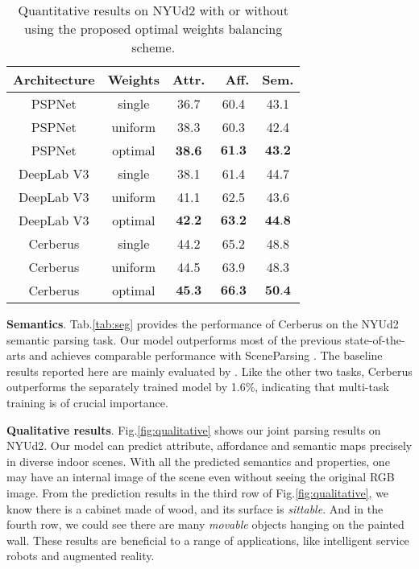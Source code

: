 \documentclass[10pt,twocolumn,letterpaper]{article}
\begin{document}
\begin{table}
	\centering
	\small 
	\begin{tabular}{c|c|ccc}
		\toprule
\textbf{Architecture} & \textbf{Weights} & \textbf{Attr.} & \ \textbf{Aff.} & \textbf{Sem.} \\
		\midrule
	    PSPNet  & single & 36.7 & 60.4 &  43.1\\
	    PSPNet & uniform & 38.3 & 60.3 & 42.4 \\
		PSPNet & optimal &\textbf{38.6} & {$\textbf{61.3}$}  & $\textbf{43.2}$ \\
		\midrule
		DeepLab V3  &single&  38.1 & 61.4 & 44.7 \\
		DeepLab V3 & uniform &  41.1 & 62.5 & 43.6\\
		DeepLab V3 & optimal &$\textbf{42.2}$ &$\textbf{63.2}$ & $\textbf{44.8}$  \\	
		\midrule
		Cerberus &single & {44.2} & 65.2 & 48.8\\
		Cerberus & uniform &  {44.5} & 63.9 & 48.3\\
		Cerberus & optimal & {$\textbf{45.3}$}  & {$\textbf{66.3}$} & {$\textbf{50.4}$} \\
		\bottomrule
	\end{tabular}
	\caption{Quantitative results on NYUd2 with or without using the proposed optimal weights balancing scheme.}
	\label{tab:moo}
\end{table}
\textbf{Semantics}. Tab.\ref{tab:seg} provides the performance of Cerberus on the NYUd2 semantic parsing task. Our model outperforms most of the previous state-of-the-arts and achieves comparable performance with SceneParsing \cite{shi2019scene}. The baseline results reported here are mainly evaluated by \cite{chen2020bi}.  Like the other two tasks, Cerberus outperforms the separately trained model by 1.6\%, indicating that multi-task training is of crucial importance.

\textbf{Qualitative results}. Fig.\ref{fig:qualitative} shows our joint parsing results on NYUd2. Our model can predict attribute, affordance and semantic maps precisely in diverse indoor scenes. With all the predicted semantics and properties, one may have an internal image of the scene even without seeing the original RGB image. From the prediction results in the third row of Fig.\ref{fig:qualitative}, we know there is a cabinet made of wood, and its surface is \emph{sittable}. And in the fourth row, we could see there are many \emph{movable} objects hanging on the painted wall. These results are beneficial to a range of applications, like intelligent service robots and augmented reality.
\end{document}
